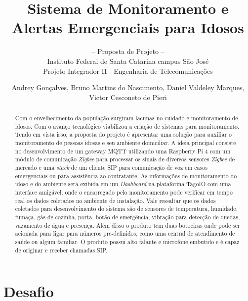 \documentclass{acm_proc_article-sp}
\begin{document}
\title{Sistema de Monitoramento e Alertas Emergenciais para Idosos}
\subtitle{\vspace{-2ex} -- Proposta de Projeto --\\
Instituto Federal de Santa Catarina campus São José\\
Projeto Integrador II - Engenharia de Telecomunicações}


\author{
\alignauthor
Andrey Gonçalves, Bruno Martins do Nascimento, Daniel Valdeley Marques, Victor Cesconeto de Pieri\\
}

\maketitle

\begin{abstract}
  Com o envelhecimento da população surgiram lacunas no cuidado e monitoramento de idosos. 
  Com o avanço tecnológico viabilizou a criação de sistemas para monitoramento. Tendo em vista isso, a proposta do projeto é apresentar uma solução para auxiliar o monitoramento de pessoas idosas e seu ambiente domiciliar. A ideia principal consiste no desenvolvimento de um gateway MQTT utilizando uma Raspberry Pi 4 com um módulo de comunicação \textit{Zigbee} para processar os sinais de diversos sensores \textit{Zigbee} de mercado e uma \textit{stack} de um cliente SIP para comunicação de voz em casos emergenciais ou para assistência ao contratante.
  As informações de monitoramento do idoso e do ambiente será exibida em um \textit{Dashboard} na plataforma TagoIO com uma interface amigável, onde o encarregado pelo monitoramento pode verificar em tempo real os dados coletados no ambiente de instalação. Vale ressaltar que os dados coletados para desenvolvimento do sistema são de sensores de temperatura, humidade, fumaça, gás de cozinha, porta, botão de emergência, vibração para detecção de quedas, vazamento de água e presença. Além disso o produto tem duas botoeiras onde pode ser acionada para ligar para números pre-definidos, como uma central de atendimento de saúde ou algum familiar. O produto possui alto falante e microfone embutido e é capaz de originar e receber chamadas SIP.
\end{abstract}


\section{Desafio}
\end{document}
